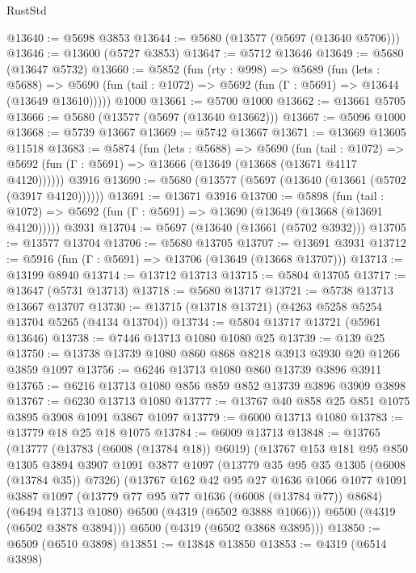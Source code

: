 \begin{lexlean}{RustStd}
\begin{coremodule}
@13640 := @5698 @3853
@13644 := @5680 (@13577 (@5697 (@13640 @5706)))
@13646 := @13600 (@5727 @3853)
@13647 := @5712 @13646
@13649 := @5680 (@13647 @5732)
@13660 := @5852
    (fun (rty : @998) =>
    @5689
      (fun (lets : @5688) =>
      @5690 (fun (tail : @1072) => @5692 (fun (Γ : @5691) => @13644 (@13649 @13610)))))
    @1000
@13661 := @5700 @1000
@13662 := @13661 @5705
@13666 := @5680 (@13577 (@5697 (@13640 @13662)))
@13667 := @5096 @1000
@13668 := @5739 @13667
@13669 := @5742 @13667
@13671 := @13669 @13605 @11518
@13683 := @5874
    (fun (lets : @5688) =>
    @5690
      (fun (tail : @1072) =>
      @5692 (fun (Γ : @5691) => @13666 (@13649 (@13668 (@13671 @4117 @4120))))))
    @3916
@13690 := @5680 (@13577 (@5697 (@13640 (@13661 (@5702 (@3917 @4120))))))
@13691 := @13671 @3916
@13700 := @5898
    (fun (tail : @1072) => @5692 (fun (Γ : @5691) => @13690 (@13649 (@13668 (@13691 @4120)))))
    @3931
@13704 := @5697 (@13640 (@13661 (@5702 @3932)))
@13705 := @13577 @13704
@13706 := @5680 @13705
@13707 := @13691 @3931
@13712 := @5916 (fun (Γ : @5691) => @13706 (@13649 (@13668 @13707)))
@13713 := @13199 @8940
@13714 := @13712 @13713
@13715 := @5804 @13705
@13717 := @13647 (@5731 @13713)
@13718 := @5680 @13717
@13721 := @5738 @13713 @13667 @13707
@13730 := @13715 (@13718 @13721) (@4263 @5258 @5254 @13704 @5265 (@4134 @13704))
@13734 := @5804 @13717 @13721 (@5961 @13646)
@13738 := @7446 @13713 @1080 @1080 @25
@13739 := @139 @25
@13750 := @13738 @13739 @1080 @860 @868 @8218 @3913 @3930 @20 @1266 @3859 @1097
@13756 := @6246 @13713 @1080 @860 @13739 @3896 @3911
@13765 := @6216 @13713 @1080 @856 @859 @852 @13739 @3896 @3909 @3898
@13767 := @6230 @13713 @1080
@13777 := @13767 @40 @858 @25 @851 @1075 @3895 @3908 @1091 @3867 @1097
@13779 := @6000 @13713 @1080
@13783 := @13779 @18 @25 @18 @1075
@13784 := @6009 @13713
@13848 := @13765
    (@13777
      (@13783 (@6008 (@13784 @18)) @6019)
      (@13767
        @153
        @181
        @95
        @850
        @1305
        @3894
        @3907
        @1091
        @3877
        @1097
        (@13779 @35 @95 @35 @1305 (@6008 (@13784 @35)) @7326)
        (@13767
          @162
          @42
          @95
          @27
          @1636
          @1066
          @1077
          @1091
          @3887
          @1097
          (@13779 @77 @95 @77 @1636 (@6008 (@13784 @77)) @8684)
          (@6494 @13713 @1080)
          @6500
          (@4319 (@6502 @3888 @1066)))
        @6500
        (@4319 (@6502 @3878 @3894)))
      @6500
      (@4319 (@6502 @3868 @3895)))
@13850 := @6509 (@6510 @3898)
@13851 := @13848 @13850
@13853 := @4319 (@6514 @3898)

\end{coremodule}
\end{lexlean}
